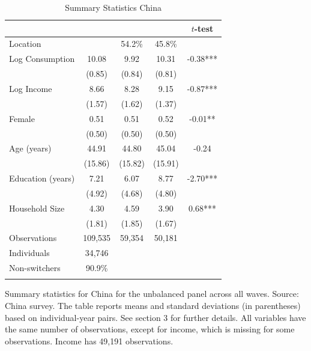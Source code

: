 \begin{table}[htbp] \centering \caption{Summary Statistics China}\label{tab:summary_stats_CHN_unb_3waves} \begin{threeparttable} \begin{tabular}{l cccc} \toprule
 &  &  &  & $t$-test \\
\midrule
Location &  &   54.2\% &   45.8\% &  \\  \addlinespace \addlinespace
Log Consumption & 10.08 & 9.92 & 10.31 & -0.38*** \\
 & (0.85) & (0.84) & (0.81) &  \\  \addlinespace
Log Income & 8.66 & 8.28 & 9.15 & -0.87*** \\
 & (1.57) & (1.62) & (1.37) &  \\  \addlinespace
Female & 0.51 & 0.51 & 0.52 & -0.01** \\
 & (0.50) & (0.50) & (0.50) &  \\  \addlinespace
Age (years) & 44.91 & 44.80 & 45.04 & -0.24 \\
 & (15.86) & (15.82) & (15.91) &  \\  \addlinespace
Education (years) & 7.21 & 6.07 & 8.77 & -2.70*** \\
 & (4.92) & (4.68) & (4.80) &  \\  \addlinespace
Household Size & 4.30 & 4.59 & 3.90 & 0.68*** \\
 & (1.81) & (1.85) & (1.67) &  \\  \addlinespace


\cmidrule{2-5}
Observations & 109,535 & 59,354 & 50,181 &  \\  \addlinespace
Individuals & 34,746 &  &  &  \\
Non-switchers &   90.9\% &  &  &  \\  \addlinespace
\bottomrule \end{tabular} \begin{tablenotes}[flushleft] \footnotesize \item{Summary statistics for China for the unbalanced panel across all waves. Source: China survey. The table reports means and standard deviations (in parentheses) based on individual-year pairs. See section 3 for further details. All variables have the same number of observations, except for income, which is missing for some observations. Income has 49,191 observations.} \end{tablenotes} \end{threeparttable} \end{table}